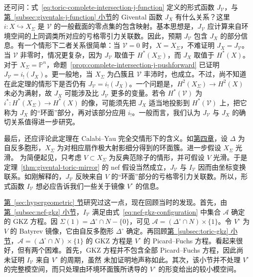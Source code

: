 还可问：式~\eqref{eq:toric-complete-intersection-j-function} 定义的形式函数 $J_{\mathcal V}$，与\hyperref[subsec:giventals-j-function]{第~\ref*{subsec:giventals-j-function} 小节}的 Givental 函数 $J_X$ 有什么关系？这里 $i:X\hookrightarrow X_\Sigma$ 是 $\mathcal V$ 的一般截面的零点集的包含映射。基本思想是，$J_{\mathcal V}$ 应计算来自环境空间的上同调类所对应的亏格零引力关联数。因此，预期 $J_{\mathcal V}$ 包含 $J_X$ 的部分信息。有一个情形下二者关系很简单：当 $\mathcal V=0$ 时，$X=X_\Sigma$，不难证明 $J_X=J_{\mathcal V}$。当 $\mathcal V$ 非零时，情况更复杂，因为 $J_{\mathcal V}$ 取值于 $H^*(X_\Sigma)$，而 $J_X$ 取值于 $H^*(X)$。对于 $X_\Sigma=\mathbb P^n$，命题~\ref{prop:complete-intersection-j-pushforward} 已证明 $J_{\mathcal V}=i_!(J_X)$。更一般地，当 $X_\Sigma$ 为凸簇且 $\mathcal V$ 丰沛时，也成立。不过，尚不知道在此定理的情形下是否仍有 $J_{\mathcal V}=i_!(J_X)$。一个问题是，$H^2(X_\Sigma)\to H^2(X)$ 未必为满射，故 $J_X$ 可能涉及比 $J_{\mathcal V}$ 更多的变量。若令 $H^*(\mathcal V)$ 为 $i^*:H^*(X_\Sigma)\to H^*(X)$ 的像，可能须先把 $J_X$ 适当地投影到 $H^*(\mathcal V)$ 上，把它称为 $J_X$ 的“环面”部分，再对该部分应用 $i_!$。一般而言，我们认为 $J_{\mathcal V}$ 与 $J_X$ 的确切关系值得进一步研究。

最后，还应评论此定理在 Calabi--Yau 完全交情形下的含义。如\hyperref[chap:mirror-constructions]{第四章}，设 $\Delta$ 为自反多胞形，$X_\Sigma$ 为对相应扇作极大射影细分得到的环面簇。进一步假设 $X_\Sigma$ 光滑。
为简便起见，只考虑 $V\subset X_\Sigma$ 为反典范除子的情形，并可假设 $V$ 光滑。于是定理~\ref{thm:givental-toric-mirror} 的 nef 假设当然成立，$J_{\mathcal V}$ 与 $I_{\mathcal V}$ 因而由坐标变换联系。如刚解释的，$J_{\mathcal V}$ 反映来自 $V$ 的“环面”部分的亏格零引力关联数。所以，形式函数 $I_{\mathcal V}$ 想必应告诉我们一些关于镜像 $V^\circ$ 的信息。

\hyperref[sec:hypergeometric]{第~\ref*{sec:hypergeometric} 节}研究过这一点，现在回顾当时的发现。首先，由\hyperref[subsec:nef-gkz]{第~\ref*{subsec:nef-gkz} 小节}，$I_{\mathcal V}$ 满足由式~\eqref{eq:nef-gkz-configuration} 中集合 $\mathcal A$ 确定的 GKZ 方程。因 $\Sigma(1)=\Delta^\circ\cap N-\{0\}$，可见 $\mathcal A=(\Delta^\circ\cap N)\times\{1\}$。令 $V^\circ$ 为 $V$ 的 Batyrev 镜像，它由自反多胞形 $\Delta^\circ$ 确定。再回顾\hyperref[subsec:toric-gkz]{第~\ref*{subsec:toric-gkz} 小节}，$\mathcal A=(\Delta^\circ\cap N)\times\{1\}$ 的 GKZ 方程是 $V^\circ$ 的 Picard--Fuchs 方程。看起来很好，但有两个困难。首先，GKZ 方程并不包含全部 Picard--Fuchs 方程，因此尚未证明 $I_{\mathcal V}$ 来自 $V^\circ$ 的周期，虽然  未加证明地声称如此。其次，该小节并不处理 $V^\circ$ 的完整模空间，而只处理由环境环面簇所诱导的 $V^\circ$ 的形变给出的较小模空间。

